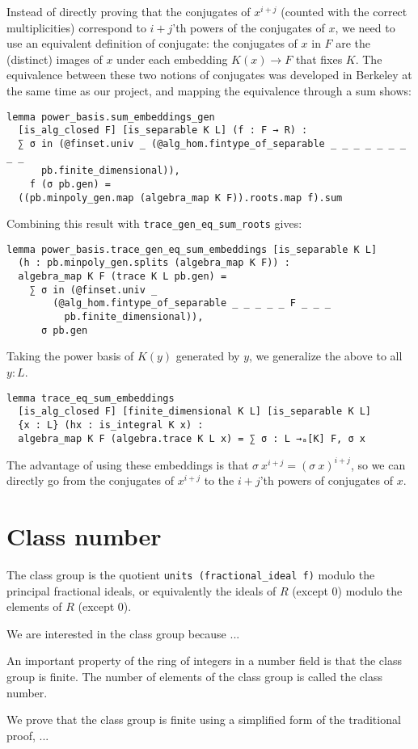 \documentclass[a4paper,USenglish,cleveref, autoref, thm-restate]{lipics-v2021}
\newcommand{\lean}[1]{\texttt{#1}\xspace} %
\begin{document}
Instead of directly proving that the conjugates of $x^{i + j}$ (counted with the correct multiplicities) correspond to $i + j$'th powers of the conjugates of $x$,
we need to use an equivalent definition of conjugate:
the conjugates of $x$ in $F$ are the (distinct) images of $x$ under each embedding $K(x) \to F$ that fixes $K$.
The equivalence between these two notions of conjugates was developed in Berkeley at the same time as our project, and mapping the equivalence through a sum shows: %
\begin{lstlisting}
lemma power_basis.sum_embeddings_gen
  [is_alg_closed F] [is_separable K L] (f : F → R) :
  ∑ σ in (@finset.univ _ (@alg_hom.fintype_of_separable _ _ _ _ _ _ _ _ _
      pb.finite_dimensional)),
    f (σ pb.gen) =
  ((pb.minpoly_gen.map (algebra_map K F)).roots.map f).sum
\end{lstlisting}
Combining this result with \lean{trace\_gen\_eq\_sum\_roots} gives:
\begin{lstlisting}
lemma power_basis.trace_gen_eq_sum_embeddings [is_separable K L]
  (h : pb.minpoly_gen.splits (algebra_map K F)) :
  algebra_map K F (trace K L pb.gen) =
    ∑ σ in (@finset.univ _
        (@alg_hom.fintype_of_separable _ _ _ _ _ F _ _ _
          pb.finite_dimensional)),
      σ pb.gen
\end{lstlisting}
Taking the power basis of $K(y)$ generated by $y$, we generalize the above to all $y : L$.
\begin{lstlisting}
lemma trace_eq_sum_embeddings
  [is_alg_closed F] [finite_dimensional K L] [is_separable K L]
  {x : L} (hx : is_integral K x) :
  algebra_map K F (algebra.trace K L x) = ∑ σ : L →ₐ[K] F, σ x
\end{lstlisting}
The advantage of using these embeddings is that $\sigma\ x^{i + j} = (\sigma\ x)^{i + j}$,
so we can directly go from the conjugates of $x^{i + j}$ to the $i + j$'th powers of conjugates of $x$.

\section{Class number}

The class group is the quotient \lean{units (fractional\_ideal f)} modulo the principal fractional ideals, or equivalently the ideals of $R$ (except $0$) modulo the elements of $R$ (except $0$).

We are interested in the class group because ...

An important property of the ring of integers in a number field is that the class group is finite. The number of elements of the class group is called the class number.

We prove that the class group is finite using a simplified form of the traditional proof, ...
\end{document}
